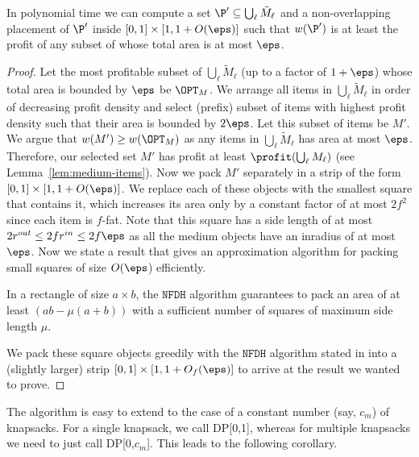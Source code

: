 {%
%

\begin{lemma}
\label{lem:med}
In polynomial time we can compute a set $\P'\subseteq \bigcup_{\ell}\tilde{M}_{\ell}$
and a non-overlapping placement of $\P'$ inside $[0,1]\times[1,1+O(\eps)]$
such that $w(\P')$ is at least the profit of any subset of 
whose total area is at most $\eps$.
\end{lemma}

\begin{proof}
Let the most profitable subset of $\bigcup_{\ell} \tilde{M}_{\ell}$
(up to a factor of $1+\eps$) whose total area is bounded by $\eps$ be $\OPT_{M}$.
 We arrange all items in $\bigcup_{\ell}\tilde{M}_{\ell}$ in order of decreasing profit density and select (prefix) subset of items with highest profit density such that their area is bounded by $2\eps$. Let this subset of items be $M'$. We argue that $w(M')\ge w(\OPT_M)$ as any items in $\bigcup_{\ell} \tilde{M}_{\ell}$ has area at most $\eps$.
 Therefore, our selected set $M'$ has profit at least $\profit(\bigcup_{\ell}M_{\ell})$
(see Lemma~\ref{lem:medium-items}).
Now we pack  $M'$ 
separately in a strip of the form $[0,1]\times[1,1+O(\eps)]$.
We replace each
of these objects with the smallest square that contains it, which
increases its area only by a constant factor of at most {$2f^2$ since each item is $f$-fat. Note that this square has a side length of at most $2r^{out} \le 2f r^{in} \le 2f\eps$ as all the medium objects have an inradius of at most $\eps$. Now we state a result that gives an approximation algorithm for packing small squares of size $O(\eps$) efficiently.}
\begin{lemma}\label{lem:nfdh}
	In a rectangle of size $a \times b$, the $\mathtt{NFDH}$ algorithm guarantees to pack an area of at least $(ab-\mu(a+b))$ with a sufficient number of squares of maximum side length $\mu$.
\end{lemma}

We pack these square objects greedily with the $\mathtt{NFDH}$ algorithm
\cite{NFDH} stated in  into a (slightly larger) strip $[0,1]\times[1,1+O_f(\eps)]$ to arrive at the result we wanted to prove.
\end{proof}
The algorithm is easy to extend to the case of a constant number (say, $c_m$) of knapsacks. For a single knapsack, we call DP[0,1], whereas for multiple knapsacks we need to just call DP[0,$c_m$]. This leads to the following corollary. 

}
